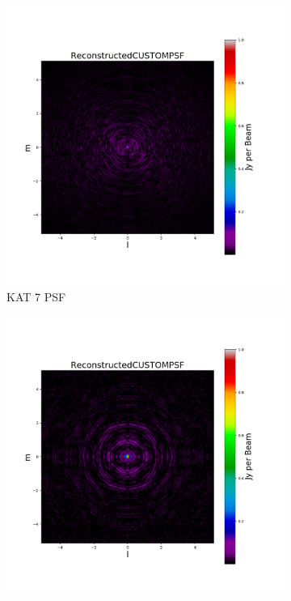 \begin{figure}[htp]
  \centering
  \begin{subfigure}[b]{0.3\textwidth}
    \includegraphics[width=\textwidth]{images/KAT_7_PSF.png}
    \caption{KAT 7 PSF}
    \label{fig:1}
  \end{subfigure}
  \begin{subfigure}[b]{0.3\textwidth}
    \includegraphics[width=\textwidth]{images/HERA_19_PSF.png}

\end{subfigure}
\end{figure}
